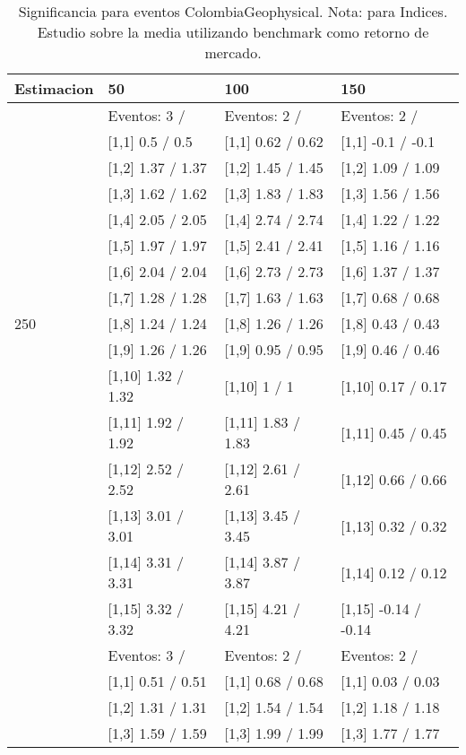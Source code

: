 \begin{table}

\caption{Significancia para eventos ColombiaGeophysical. Nota: para Indices. Estudio sobre la media utilizando benchmark como retorno de mercado.}
\centering
\begin{tabular}[t]{llll}
\toprule
Estimacion & 50 & 100 & 150\\
\midrule
 & Eventos:  3 / & Eventos:  2 / & Eventos:  2 /\\
 & {}[1,1] 0.5  / 0.5 & {}[1,1] 0.62  / 0.62 & {}[1,1] -0.1  / -0.1\\
 & {}[1,2] 1.37  / 1.37 & {}[1,2] 1.45  / 1.45 & {}[1,2] 1.09  / 1.09\\
 & {}[1,3] 1.62  / 1.62 & {}[1,3] 1.83  / 1.83 & {}[1,3] 1.56  / 1.56\\
 & {}[1,4] 2.05  / 2.05 & {}[1,4] 2.74  / 2.74 & {}[1,4] 1.22  / 1.22\\
\addlinespace
 & {}[1,5] 1.97  / 1.97 & {}[1,5] 2.41  / 2.41 & {}[1,5] 1.16  / 1.16\\
 & {}[1,6] 2.04  / 2.04 & {}[1,6] 2.73  / 2.73 & {}[1,6] 1.37  / 1.37\\
 & {}[1,7] 1.28  / 1.28 & {}[1,7] 1.63  / 1.63 & {}[1,7] 0.68  / 0.68\\
250 & {}[1,8] 1.24  / 1.24 & {}[1,8] 1.26  / 1.26 & {}[1,8] 0.43  / 0.43\\
 & {}[1,9] 1.26  / 1.26 & {}[1,9] 0.95  / 0.95 & {}[1,9] 0.46  / 0.46\\
\addlinespace
 & {}[1,10] 1.32  / 1.32 & {}[1,10] 1  / 1 & {}[1,10] 0.17  / 0.17\\
 & {}[1,11] 1.92  / 1.92 & {}[1,11] 1.83  / 1.83 & {}[1,11] 0.45  / 0.45\\
 & {}[1,12] 2.52  / 2.52 & {}[1,12] 2.61  / 2.61 & {}[1,12] 0.66  / 0.66\\
 & {}[1,13] 3.01  / 3.01 & {}[1,13] 3.45  / 3.45 & {}[1,13] 0.32  / 0.32\\
 & {}[1,14] 3.31  / 3.31 & {}[1,14] 3.87  / 3.87 & {}[1,14] 0.12  / 0.12\\
\addlinespace
 & {}[1,15] 3.32  / 3.32 & {}[1,15] 4.21  / 4.21 & {}[1,15] -0.14  / -0.14\\
 & Eventos:  3 / & Eventos:  2 / & Eventos:  2 /\\
 & {}[1,1] 0.51  / 0.51 & {}[1,1] 0.68  / 0.68 & {}[1,1] 0.03  / 0.03\\
 & {}[1,2] 1.31  / 1.31 & {}[1,2] 1.54  / 1.54 & {}[1,2] 1.18  / 1.18\\
 & {}[1,3] 1.59  / 1.59 & {}[1,3] 1.99  / 1.99 & {}[1,3] 1.77  / 1.77\\

\end{tabular}
\end{table}
